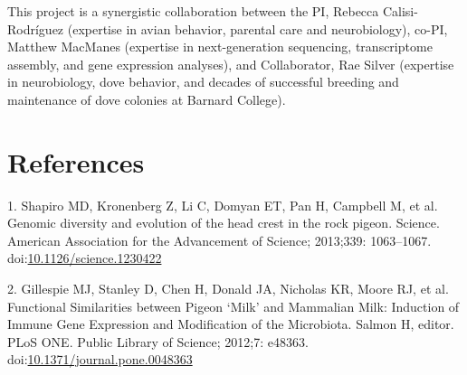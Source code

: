 \documentclass[10pt,letterpaper]{article}
\begin{document}
This project is a synergistic collaboration between the PI, Rebecca
Calisi-Rodríguez (expertise in avian behavior, parental care and
neurobiology), co-PI, Matthew MacManes (expertise in next-generation
sequencing, transcriptome assembly, and gene expression analyses), and
Collaborator, Rae Silver (expertise in neurobiology, dove behavior, and
decades of successful breeding and maintenance of dove colonies at
Barnard College).

\hypertarget{references}{%
\section*{References}\label{references}}

\hypertarget{refs}{}
\leavevmode\hypertarget{ref-Shapiro1063}{}%
1. Shapiro MD, Kronenberg Z, Li C, Domyan ET, Pan H, Campbell M, et al.
Genomic diversity and evolution of the head crest in the rock pigeon.
Science. American Association for the Advancement of Science; 2013;339:
1063--1067.
doi:\href{https://doi.org/10.1126/science.1230422}{10.1126/science.1230422}

\leavevmode\hypertarget{ref-Gillespie2012}{}%
2. Gillespie MJ, Stanley D, Chen H, Donald JA, Nicholas KR, Moore RJ, et
al. Functional Similarities between Pigeon `Milk' and Mammalian Milk:
Induction of Immune Gene Expression and Modification of the Microbiota.
Salmon H, editor. PLoS ONE. Public Library of Science; 2012;7: e48363.
doi:\href{https://doi.org/10.1371/journal.pone.0048363}{10.1371/journal.pone.0048363}

\nolinenumbers
\end{document}
